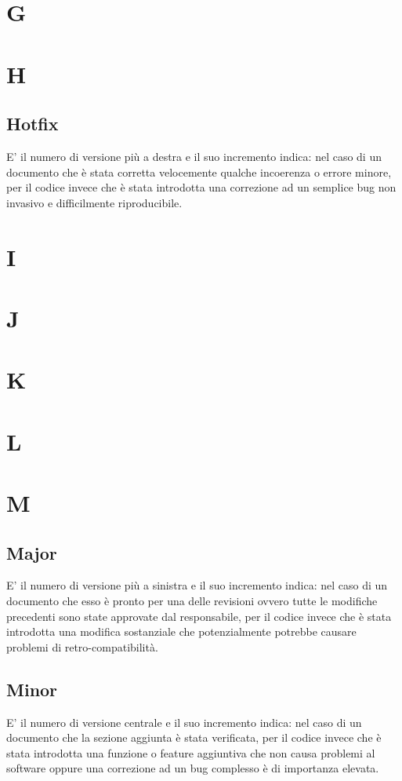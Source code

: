 \section{G}
\section{H}
    \subsection{Hotfix}
    E' il numero di versione più a destra e il suo incremento indica: nel caso di un documento che è stata corretta velocemente qualche incoerenza o errore minore, per il codice invece che è stata
    introdotta una correzione ad un semplice bug non invasivo e difficilmente riproducibile.

\section{I}
\section{J}
\section{K}
\section{L}
\section{M}
    \subsection{Major}
    E' il numero di versione più a sinistra e il suo incremento indica: nel caso di un documento che esso è pronto per una delle revisioni ovvero tutte le modifiche precedenti sono state 
    approvate dal responsabile, per il codice invece che è stata introdotta una modifica sostanziale che potenzialmente potrebbe causare problemi di retro-compatibilità.
    \subsection{Minor}
    E' il numero di versione centrale e il suo incremento indica: nel caso di un documento che la sezione aggiunta è stata verificata, per il codice invece che è stata
    introdotta una funzione o feature aggiuntiva che non causa problemi al software oppure una correzione ad un bug complesso è di importanza elevata.

